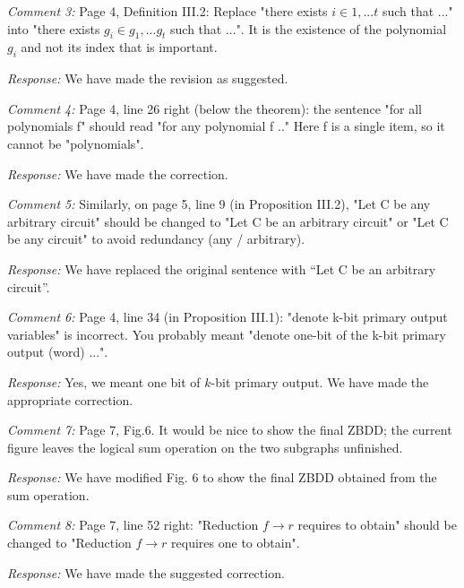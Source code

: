 \documentclass[conference, onecolumn]{IEEEtran}
\begin{document}
\par{\it Comment 3:} Page 4, Definition III.2: Replace "there exists $i \in {1,...t}$ such that ..." into "there exists $g_i \in {g_1,...g_t}$ such that ...". It is the existence of the polynomial $g_i$ and not its index that is important.
\par{\it Response:} 
We have made the revision as suggested.

\par{\it Comment 4:} Page 4, line 26 right (below the theorem): the sentence "for all polynomials f" should read "for any polynomial f .." Here f is a single item, so it cannot be "polynomials".
\par{\it Response:} We have made the correction.

\par{\it Comment 5:} Similarly, on page 5, line 9 (in Proposition III.2), "Let C be any arbitrary circuit" should be changed to "Let C be an arbitrary circuit" or "Let C be any circuit" to avoid redundancy (any / arbitrary).
\par{\it Response:} We have replaced the original sentence with ``Let C be an arbitrary circuit''.

\par{\it Comment 6:} Page 4, line 34 (in Proposition III.1): "denote k-bit primary output variables" is incorrect. You probably meant "denote one-bit of the k-bit primary output (word) ...".
\par{\it Response:} Yes, we meant one bit of $k$-bit primary output. We have made the appropriate correction.

\par{\it Comment 7:} Page 7, Fig.6. It would be nice to show the final ZBDD; the current figure leaves the logical sum operation on the two subgraphs unfinished.
\par{\it Response:} We have modified Fig. 6 to show the final ZBDD obtained from the sum operation.

\par{\it Comment 8:} Page 7, line 52 right: "Reduction $f \rightarrow r$ requires to obtain" should be changed to "Reduction $f \rightarrow r$ requires one to obtain".
\par{\it Response:} We have made the suggested correction.
\end{document}
